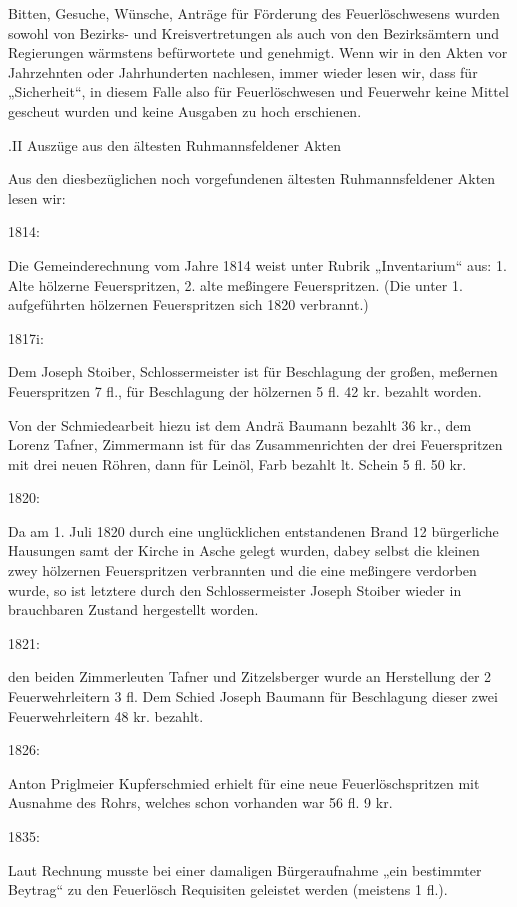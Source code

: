 \documentclass[12pt,a4pager]{book}
\begin{document}
Bitten, Gesuche, Wünsche, Anträge für Förderung des Feuerlöschwesens wurden
sowohl von Bezirks- und Kreisvertretungen als auch von den Bezirksämtern und
Regierungen wärmstens befürwortete und genehmigt. Wenn wir in den Akten vor
Jahrzehnten oder Jahrhunderten nachlesen, immer wieder lesen wir, dass für
„Sicherheit“, in diesem Falle also für Feuerlöschwesen und Feuerwehr keine
Mittel gescheut wurden und keine Ausgaben zu hoch erschienen.

.II Auszüge aus den ältesten Ruhmannsfeldener Akten

Aus den diesbezüglichen noch vorgefundenen ältesten Ruhmannsfeldener Akten lesen
wir:

1814:

Die Gemeinderechnung vom Jahre 1814 weist unter Rubrik „Inventarium“ aus: 1.
Alte hölzerne Feuerspritzen, 2. alte meßingere Feuerspritzen. (Die unter 1.
aufgeführten hölzernen Feuerspritzen sich 1820 verbrannt.)

1817i:

Dem Joseph Stoiber, Schlossermeister ist für Beschlagung der großen, meßernen
Feuerspritzen 7 fl., für Beschlagung der hölzernen 5 fl. 42 kr. bezahlt worden.

Von der Schmiedearbeit hiezu ist dem Andrä Baumann bezahlt 36 kr., dem Lorenz
Tafner, Zimmermann ist für das Zusammenrichten der drei Feuerspritzen mit drei
neuen Röhren, dann für Leinöl, Farb bezahlt lt. Schein 5 fl. 50 kr.

1820:

Da am 1. Juli 1820 durch eine unglücklichen entstandenen Brand 12 bürgerliche
Hausungen samt der Kirche in Asche gelegt wurden, dabey selbst die kleinen zwey
hölzernen Feuerspritzen verbrannten und die eine meßingere verdorben wurde, so
ist letztere durch den Schlossermeister Joseph Stoiber wieder in brauchbaren
Zustand hergestellt worden.

1821:

den beiden Zimmerleuten Tafner und Zitzelsberger wurde an Herstellung der 2
Feuerwehrleitern 3 fl. Dem Schied Joseph Baumann für Beschlagung dieser zwei
Feuerwehrleitern 48 kr. bezahlt.

1826:

Anton Priglmeier Kupferschmied erhielt für eine neue Feuerlöschspritzen mit
Ausnahme des Rohrs, welches schon vorhanden war 56 fl. 9 kr.

1835:

Laut Rechnung musste bei einer damaligen Bürgeraufnahme „ein bestimmter Beytrag“
zu den Feuerlösch Requisiten geleistet werden (meistens 1 fl.).
\end{document}
